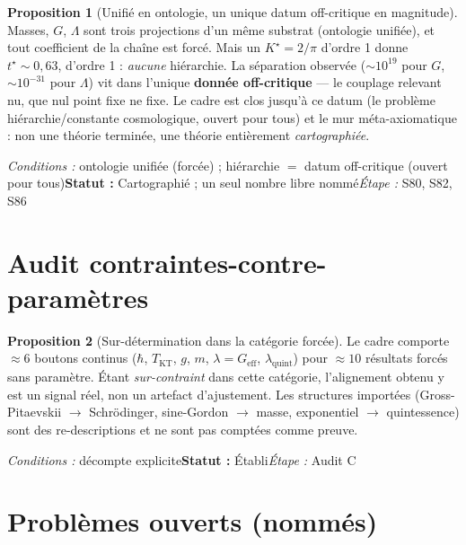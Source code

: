 \documentclass[11pt,a4paper]{article}
\theoremstyle{definition}
\newtheorem{prop}{Proposition}
\newcommand{\statut}[3]{\par\smallskip\noindent\textit{Conditions :} #1\quad\textbf{Statut :} #2\quad\textit{Étape :} #3\par\medskip}
\begin{document}
\begin{prop}[Unifié en ontologie, un unique datum off-critique en magnitude]
Masses, $G$, $\Lambda$ sont trois projections d'un même substrat (ontologie unifiée), et tout coefficient de la chaîne est forcé. Mais un $K^\star=2/\pi$ d'ordre 1 donne $t^\star\!\sim\!0{,}63$, d'ordre 1 : \emph{aucune} hiérarchie. La séparation observée ($\sim 10^{19}$ pour $G$, $\sim 10^{-31}$ pour $\Lambda$) vit dans l'unique \textbf{donnée off-critique} — le couplage relevant nu, que nul point fixe ne fixe. Le cadre est clos jusqu'à ce datum (le problème hiérarchie/constante cosmologique, ouvert pour tous) et le mur méta-axiomatique : non une théorie terminée, une théorie entièrement \emph{cartographiée}.
\end{prop}
\statut{ontologie unifiée (forcée) ; hiérarchie $=$ datum off-critique (ouvert pour tous)}{Cartographié ; un seul nombre libre nommé}{S80, S82, S86}

\section*{Audit contraintes-contre-paramètres}

\begin{prop}[Sur-détermination dans la catégorie forcée]
Le cadre comporte $\approx 6$ boutons continus ($\hbar$, $T_{\mathrm{KT}}$, $g$, $m$, $\lambda=G_{\mathrm{eff}}$, $\lambda_{\mathrm{quint}}$) pour $\approx 10$ résultats forcés sans paramètre. Étant \emph{sur-contraint} dans cette catégorie, l'alignement obtenu y est un signal réel, non un artefact d'ajustement. Les structures importées (Gross-Pitaevskii $\to$ Schrödinger, sine-Gordon $\to$ masse, exponentiel $\to$ quintessence) sont des re-descriptions et ne sont pas comptées comme preuve.
\end{prop}
\statut{décompte explicite}{Établi}{Audit C}

\section*{Problèmes ouverts (nommés)}
\end{document}
